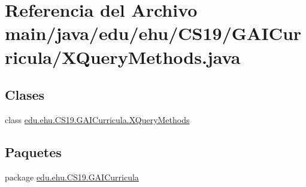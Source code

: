 \hypertarget{a00008}{}\section{Referencia del Archivo main/java/edu/ehu/\+C\+S19/\+G\+A\+I\+Curricula/\+X\+Query\+Methods.java}
\label{a00008}
\subsection*{Clases}
\begin{DoxyCompactItemize}
\item 
class \mbox{\hyperlink{a00033}{edu.\+ehu.\+C\+S19.\+G\+A\+I\+Curricula.\+X\+Query\+Methods}}
\end{DoxyCompactItemize}
\subsection*{Paquetes}
\begin{DoxyCompactItemize}
\item 
package \mbox{\hyperlink{a00017}{edu.\+ehu.\+C\+S19.\+G\+A\+I\+Curricula}}
\end{DoxyCompactItemize}
